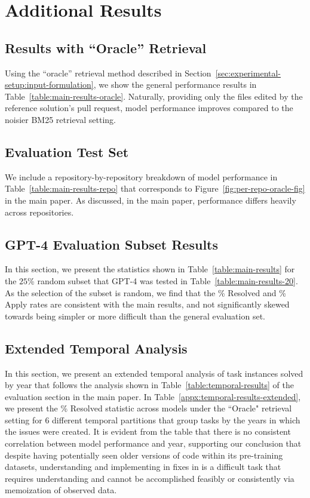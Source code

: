 \section{Additional Results}
\label{appx:extra-results}

\subsection{Results with ``Oracle'' Retrieval}

Using the ``oracle'' retrieval method described in Section~\ref{sec:experimental-setup:input-formulation}, we show the general performance results in Table~\ref{table:main-results-oracle}. Naturally, providing only the files edited by the reference solution's pull request, model performance improves compared to the noisier BM25 retrieval setting.

\subsection{Evaluation Test Set}

We include a repository-by-repository breakdown of model performance in Table~\ref{table:main-results-repo} that corresponds to Figure~\ref{fig:per-repo-oracle-fig} in the main paper. As discussed, in the main paper, performance differs heavily across repositories.

\subsection{GPT-4 Evaluation Subset Results}
In this section, we present the statistics shown in Table~\ref{table:main-results} for the $25$\% random subset that GPT-4 was tested in Table~\ref{table:main-results-20}.
As the selection of the subset is random, we find that the \% Resolved and \% Apply rates are consistent with the main results, and not significantly skewed towards being simpler or more difficult than the general evaluation set.



\subsection{Extended Temporal Analysis}

In this section, we present an extended temporal analysis of task instances solved by year that follows the analysis shown in Table~\ref{table:temporal-results} of the evaluation section in the main paper.
In Table~\ref{appx:temporal-results-extended}, we present the \% Resolved statistic across models under the ``Oracle" retrieval setting for $6$ different temporal partitions that group tasks by the years in which the issues were created.
It is evident from the table that there is no consistent correlation between model performance and year, supporting our conclusion that despite having potentially seen older versions of code within its pre-training datasets, understanding and implementing in fixes in \benchmark{} is a difficult task that requires understanding and cannot be accomplished feasibly or consistently via memoization of observed data.

